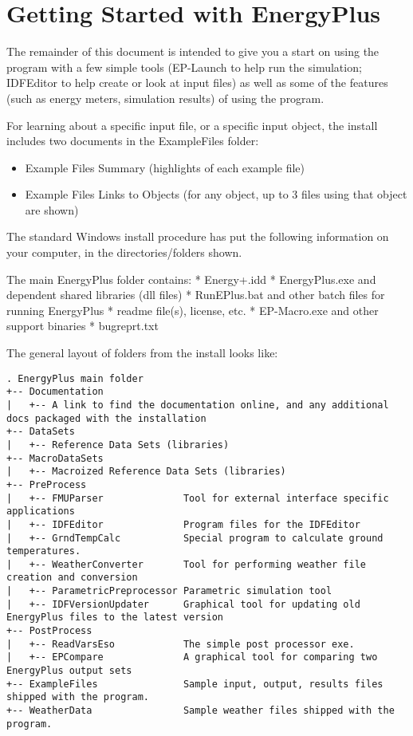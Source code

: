 \chapter{Getting Started with EnergyPlus}\label{getting-started-with-energyplus}

The remainder of this document is intended to give you a start on using the program with a few simple tools (EP-Launch to help run the simulation; IDFEditor to help create or look at input files) as well as some of the features (such as energy meters, simulation results) of using the program.

For learning about a specific input file, or a specific input object, the install includes two documents in the ExampleFiles folder:

\begin{itemize}
\item
  Example Files Summary (highlights of each example file)
\item
  Example Files Links to Objects (for any object, up to 3 files using that object are shown)
\end{itemize}

The standard Windows install procedure has put the following information on your computer, in the directories/folders shown.

The main EnergyPlus folder contains: * Energy+.idd * EnergyPlus.exe and dependent shared libraries (dll files) * RunEPlus.bat and other batch files for running EnergyPlus * readme file(s), license, etc. * EP-Macro.exe and other support binaries * bugreprt.txt~

The general layout of folders from the install looks like:

\begin{lstlisting}
. EnergyPlus main folder
+-- Documentation
|   +-- A link to find the documentation online, and any additional docs packaged with the installation
+-- DataSets
|   +-- Reference Data Sets (libraries)
+-- MacroDataSets
|   +-- Macroized Reference Data Sets (libraries)
+-- PreProcess
|   +-- FMUParser              Tool for external interface specific applications
|   +-- IDFEditor              Program files for the IDFEditor
|   +-- GrndTempCalc           Special program to calculate ground temperatures.
|   +-- WeatherConverter       Tool for performing weather file creation and conversion
|   +-- ParametricPreprocessor Parametric simulation tool
|   +-- IDFVersionUpdater      Graphical tool for updating old EnergyPlus files to the latest version
+-- PostProcess
|   +-- ReadVarsEso            The simple post processor exe.
|   +-- EPCompare              A graphical tool for comparing two EnergyPlus output sets
+-- ExampleFiles               Sample input, output, results files shipped with the program.
+-- WeatherData                Sample weather files shipped with the program.
\end{lstlisting}
